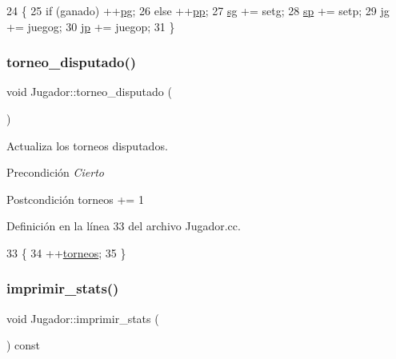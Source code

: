 \begin{DoxyCode}
24                                                                                   \{
25     \textcolor{keywordflow}{if} (ganado) ++\hyperlink{class_jugador_ab254a72417747985ffaf53b0508e5e31}{pg};
26     \textcolor{keywordflow}{else} ++\hyperlink{class_jugador_a90af14828909d3c5cd3fb4a285e96daf}{pp};
27     \hyperlink{class_jugador_a678970fa93782e3e68f939c37fff5030}{sg} += setg;
28     \hyperlink{class_jugador_a5bed10a21acb0c437828df282050b2ab}{sp} += setp;
29     \hyperlink{class_jugador_a53ac73c3dc720ca6e66406b309077472}{jg} += juegog;
30     \hyperlink{class_jugador_a306eb04292a1aa300a39c2464c1368fd}{jp} += juegop;
31 \}
\end{DoxyCode}
\mbox{\label{class_jugador_a5e1cd15a764a285556e35257209a2c8c}} 
\subsubsection{\texorpdfstring{torneo\+\_\+disputado()}{torneo\_disputado()}}
{\footnotesize\ttfamily void Jugador\+::torneo\+\_\+disputado (\begin{DoxyParamCaption}{ }\end{DoxyParamCaption})}



Actualiza los torneos disputados. 

\begin{DoxyPrecond}{Precondición}
{\itshape Cierto} 
\end{DoxyPrecond}
\begin{DoxyPostcond}{Postcondición}
torneos += 1 
\end{DoxyPostcond}


Definición en la línea 33 del archivo Jugador.\+cc.


\begin{DoxyCode}
33                               \{
34     ++\hyperlink{class_jugador_a2c4256c69ddf76e1c4f1e48f56ed305c}{torneos};
35 \}
\end{DoxyCode}
\mbox{\label{class_jugador_a8bd81b77ba3d2e46bee69ea2f628f00d}} 
\subsubsection{\texorpdfstring{imprimir\+\_\+stats()}{imprimir\_stats()}}
{\footnotesize\ttfamily void Jugador\+::imprimir\+\_\+stats (\begin{DoxyParamCaption}{ }\end{DoxyParamCaption}) const}




